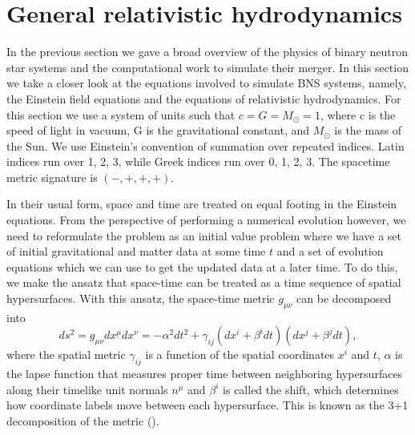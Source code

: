 


\section{General relativistic hydrodynamics}

In the previous section we gave a broad overview of the physics of binary neutron star systems and the computational work to simulate their merger. In this section we take a closer look at the equations involved to simulate BNS systems, namely, the Einstein field equations and the equations of relativistic hydrodynamics. For this section we use a system of units such
that $c = G = M_\odot = 1$, where c is the speed of light in
vacuum, G is the gravitational constant, and $M_\odot$ is the mass
of the Sun. We use Einstein's convention of summation over
repeated indices. Latin indices run over 1, 2, 3, while Greek
indices run over 0, 1, 2, 3. The spacetime metric signature is $(-,+,+,+)$.

In their usual form, space and time are treated on equal footing in the Einstein equations. From the perspective of performing a numerical evolution however, we need to reformulate the problem as an initial value problem where we have a set of initial gravitational and matter data at some time $t$ and a set of evolution equations which we can use to get the updated data at a later time. To do this, we make the ansatz that space-time can be treated as a time sequence of spatial hypersurfaces. With this ansatz, the space-time metric $g_{\mu\nu}$ can be decomposed into
%
\begin{equation}
\label{eq:4}
ds^{2} = g_{\mu\nu}dx^{\mu}dx^{\nu} = -\alpha^2dt^2 + \gamma_{ij}(dx^i+\beta^idt)(dx^j+\beta^jdt),
\end{equation}
%
where the spatial metric $\gamma_{ij}$ is a function of the spatial coordinates $x^{i}$ and $t$, $\alpha$ is the lapse function that measures proper time between neighboring hypersurfaces along their timelike unit normals $n^{\mu}$ and $\beta^i$ is called the shift, which determines how coordinate labels move between each hypersurface. This is known as the 3+1 decomposition of the metric (\citet*{arnowitt1959dynamical}).

